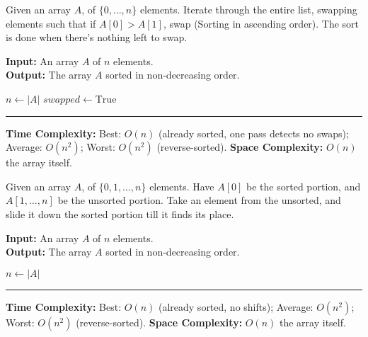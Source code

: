 \begin{Func}
    Given an array $A$, of $\{0,\ldots,n\}$ elements. Iterate through the entire list, swapping elements such that
    if $A[0]>A[1]$, swap (Sorting in ascending order). The sort is done when there's nothing left to swap.

    \vspace{.5em}
    \noindent
    \textbf{Input:} An array $A$ of $n$ elements.\\
    \textbf{Output:} The array $A$ sorted in non-decreasing order.\\
    \begin{algorithm}[H]
        \SetAlgoLined
        $n \gets |A|$\;
        $\mathit{swapped} \gets \text{True}$\;
    \end{algorithm}

    \noindent
    \rule{\textwidth}{0.4pt}
    \noindent
    \textbf{Time Complexity:} Best: $O(n)$ (already sorted, one pass detects no swaps);  
    Average: $O(n^2)$;  
    Worst: $O(n^2)$ (reverse-sorted). \textbf{Space Complexity:} $O(n)$ the array itself.
\end{Func}

\begin{Func}
    Given an array $A$, of $\{0,1,\ldots,n\}$ elements. Have $A[0]$ be the sorted portion,
    and $A[1,\ldots,n]$ be the unsorted portion. Take an element from the unsorted,
    and slide it down the sorted portion till it finds its place.

    \vspace{.5em}
    \noindent
    \textbf{Input:} An array $A$ of $n$ elements.\\
    \textbf{Output:} The array $A$ sorted in non-decreasing order.\\
    \begin{algorithm}[H]
        \SetAlgoLined
        $n \gets |A|$\;
    \end{algorithm}

    \noindent
    \rule{\textwidth}{0.4pt}
    \noindent
    \textbf{Time Complexity:} Best: $O(n)$ (already sorted, no shifts);  
    Average: $O(n^2)$;  
    Worst: $O(n^2)$ (reverse-sorted).
    \textbf{Space Complexity:} $O(n)$ the array itself.
\end{Func}

